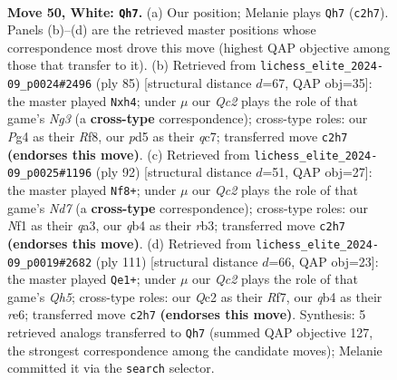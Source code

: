 \documentclass[11pt]{article}
\begin{document}
\clearpage

\begin{figure}[p]\centering
\begin{subfigure}{0.46\textwidth}\centering
\resizebox{\linewidth}{!}{%
\newchessgame
\chessboard[
  setfen={r5r1/pk4p1/7p/3p3P/pq1P2Pb/4P3/2Q3K1/5N2 w - - 8 50},
  showmover=false,
  pgfstyle=straightmove, color=movearrow, markmove={c2-h7}
]}
\caption{}
\end{subfigure}\hfill
\begin{subfigure}{0.46\textwidth}\centering
\resizebox{\linewidth}{!}{%
\newchessgame
\chessboard[
  setfen={5rq1/2QR4/6nk/1p1P1p2/4p2P/1P6/2P2P2/5K1B b - - 0 43},
  showmover=false,
  pgfstyle=straightmove, color=movearrow, markmove={g6-h4}
]}
\caption{}
\end{subfigure}
\\[4pt]
\begin{subfigure}{0.46\textwidth}\centering
\resizebox{\linewidth}{!}{%
\newchessgame
\chessboard[
  setfen={4Q3/2pN2pk/1pp4p/8/3P1PP1/qr5P/7K/8 w - - 1 47},
  showmover=false,
  pgfstyle=straightmove, color=movearrow, markmove={d7-f8}
]}
\caption{}
\end{subfigure}\hfill
\begin{subfigure}{0.46\textwidth}\centering
\resizebox{\linewidth}{!}{%
\newchessgame
\chessboard[
  setfen={8/k4r2/p3RP1p/3p4/P1pP3q/2P1P3/6R1/6K1 b - - 4 56},
  showmover=false,
  pgfstyle=straightmove, color=movearrow, markmove={h4-e1}
]}
\caption{}
\end{subfigure}
\caption{\textbf{Move 50, White: \texttt{Qh7}.} (a) Our position; Melanie plays \texttt{Qh7} (\texttt{c2h7}). Panels (b)--(d) are the retrieved master positions whose correspondence most drove this move (highest QAP objective among those that transfer to it). (b) Retrieved from \texttt{lichess\_elite\_2024-09\_p0024\#2496} (ply 85) [structural distance $d$=67, QAP obj=35]: the master played \texttt{Nxh4}; under $\mu$ our \emph{Qc2} plays the role of that game's \emph{Ng3} (a \textbf{cross-type} correspondence); cross-type roles: our \emph{P}g4 as their \emph{R}f8, our \emph{p}d5 as their \emph{q}c7; transferred move \texttt{c2h7} \textbf{(endorses this move)}. (c) Retrieved from \texttt{lichess\_elite\_2024-09\_p0025\#1196} (ply 92) [structural distance $d$=51, QAP obj=27]: the master played \texttt{Nf8+}; under $\mu$ our \emph{Qc2} plays the role of that game's \emph{Nd7} (a \textbf{cross-type} correspondence); cross-type roles: our \emph{N}f1 as their \emph{q}a3, our \emph{q}b4 as their \emph{r}b3; transferred move \texttt{c2h7} \textbf{(endorses this move)}. (d) Retrieved from \texttt{lichess\_elite\_2024-09\_p0019\#2682} (ply 111) [structural distance $d$=66, QAP obj=23]: the master played \texttt{Qe1+}; under $\mu$ our \emph{Qc2} plays the role of that game's \emph{Qh5}; cross-type roles: our \emph{Q}c2 as their \emph{R}f7, our \emph{q}b4 as their \emph{r}e6; transferred move \texttt{c2h7} \textbf{(endorses this move)}. Synthesis: 5 retrieved analogs transferred to \texttt{Qh7} (summed QAP objective 127, the strongest correspondence among the candidate moves); Melanie committed it via the \texttt{search} selector.}
\label{fig:thought-m98}
\end{figure}
\end{document}
